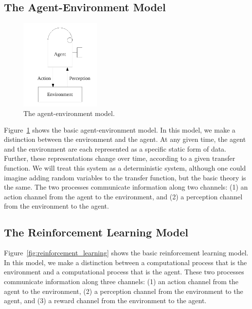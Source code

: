 \subsection{The Agent-Environment Model}

\begin{figure}[bth]
  \center
  \includegraphics[width=4cm]{gfx/agent_environment}
  \caption[The agent-environment model]{The agent-environment model.}
  \label{fig:agent_environment}
\end{figure}

Figure~\ref{fig:agent_environment} shows the basic agent-environment
model.  In this model, we make a distinction between the environment
and the agent.  At any given time, the agent and the environment are
each represented as a specific static form of data.  Further, these
representations change over time, according to a given transfer
function.  We will treat this system as a deterministic system,
although one could imagine adding random variables to the transfer
function, but the basic theory is the same.  The two processes
communicate information along two channels: (1) an action channel from
the agent to the environment, and (2) a perception channel from the
environment to the agent.





\subsection{The Reinforcement Learning Model}

Figure~\ref{fig:reinforcement_learning} shows the basic reinforcement
learning model.  In this model, we make a distinction between a
computational process that is the environment and a computational
process that is the agent.  These two processes communicate
information along three channels: (1) an action channel from the agent
to the environment, (2) a perception channel from the environment to
the agent, and (3) a reward channel from the environment to the agent.

